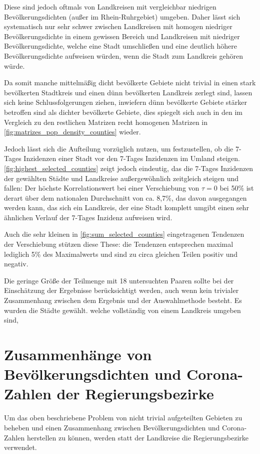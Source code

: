 Diese sind jedoch oftmals von Landkreisen mit vergleichbar niedrigen Bevölkerungsdichten (außer im Rhein-Ruhrgebiet) umgeben. Daher lässt sich systematisch nur sehr schwer zwischen Landkreisen mit homogen niedriger Bevölkerungsdichte in einem gewissen Bereich und Landkreisen mit niedriger Bevölkerungsdichte, welche eine Stadt umschließen und eine deutlich höhere Bevölkerungsdichte aufweisen würden, wenn die Stadt zum Landkreis gehören würde.

Da somit manche mittelmäßig dicht bevölkerte Gebiete nicht trivial in einen stark bevölkerten Stadtkreis und einen dünn bevölkerten Landkreis zerlegt sind, lassen sich keine Schlussfolgerungen ziehen, inwiefern dünn bevölkerte Gebiete stärker betroffen sind als dichter bevölkerte Gebiete, dies spiegelt sich auch in den im Vergleich zu den restlichen Matrizen recht homogenen Matrizen in \autoref{fig:matrizes_pop_density_counties} wieder.

Jedoch lässt sich die Aufteilung vorzüglich nutzen, um festzustellen, ob die 7-Tages Inzidenzen einer Stadt vor den 7-Tages Inzidenzen im Umland steigen.
\autoref{fig:highest_selected_counties} zeigt jedoch eindeutig, das die 7-Tages Inzidenzen der gewählten Städte und Landkreise außergewöhnlich zeitgleich steigen und fallen: Der höchste Korrelationswert bei einer Verschiebung von $\tau=0$ bei 50\% ist derart über dem nationalen Durchschnitt von ca. 8,7\%, das davon ausgegangen werden kann, das sich ein Landkreis, der eine Stadt komplett umgibt einen sehr ähnlichen Verlauf der 7-Tages Inzidenz aufweisen wird.

Auch die sehr kleinen in \autoref{fig:sum_selected_counties} eingetragenen Tendenzen der Verschiebung stützen diese These: die Tendenzen entsprechen maximal lediglich 5\% des Maximalwerts und sind zu circa gleichen Teilen positiv und negativ.

Die geringe Größe der Teilmenge mit 18 untersuchten Paaren sollte bei der Einschätzung der Ergebnisse berücksichtigt werden, auch wenn kein trivialer Zusammenhang zwischen dem Ergebnis und der Auswahlmethode besteht. Es wurden die Städte gewählt. welche vollständig von einem Landkreis umgeben sind,

\section{Zusammenhänge von Bevölkerungsdichten und Corona-Zahlen der Regierungsbezirke}\label{sec:discussion:pop_density_districts}
Um das oben beschriebene Problem von nicht trivial aufgeteilten Gebieten zu beheben und einen Zusammenhang zwischen Bevölkerungsdichten und Corona-Zahlen herstellen zu können, werden statt der Landkreise die Regierungsbezirke verwendet.


